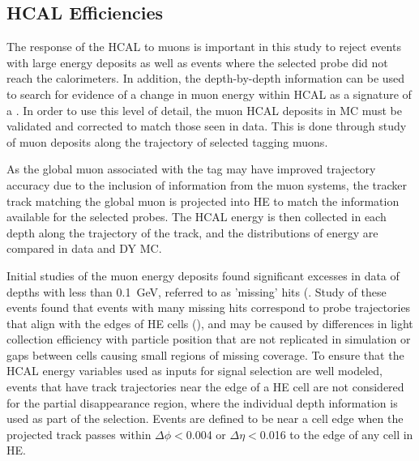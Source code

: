 \subsection{HCAL Efficiencies}
\label{sec:HCALeff}
The response of the HCAL to muons is important in this study to reject events with large energy deposits as well as events where the selected probe did not reach the calorimeters.
In addition, the depth-by-depth information can be used to search for evidence of a change in muon energy within HCAL as a signature of a \dbrem.
In order to use this level of detail, the muon HCAL deposits in MC must be validated and corrected to match those seen in data.
This is done through study of muon deposits along the trajectory of selected tagging muons.

As the global muon associated with the tag may have improved trajectory accuracy due to the inclusion of information from the muon systems, the tracker track matching the global muon is projected into HE to match the information available for the selected probes.
The HCAL energy is then collected in each depth along the trajectory of the track, and the distributions of energy are compared in data and DY MC. 

Initial studies of the muon energy deposits found significant excesses in data of depths with less than \SI{0.1}{\giga\eV}, referred to as 'missing' hits (. 
Study of these events found that events with many missing hits correspond to probe trajectories that align with the edges of HE cells (), and may be caused by differences in light collection efficiency with particle position that are not replicated in simulation or gaps between cells causing small regions of missing coverage.
To ensure that the HCAL energy variables used as inputs for signal selection are well modeled, events that have track trajectories near the edge of a HE cell are not considered for the partial disappearance region, where the individual depth information is used as part of the selection.
Events are defined to be near a cell edge when the projected track passes within $\Delta\phi<$0.004 or $\Delta\eta<$0.016 to the edge of any cell in HE.

